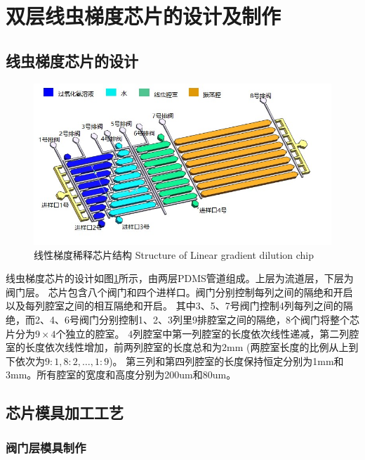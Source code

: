 \section{双层线虫梯度芯片的设计及制作}
\subsection{线虫梯度芯片的设计}
\label{arch-design}
\begin{figure}[htbp]
	  \centering
	  \includegraphics[width=13cm]{figure/chap2/chip-arch.jpg}
	  \bicaption
		{线性梯度稀释芯片结构}
		{Structure of Linear gradient dilution chip}
	  \label{fig:chap2:chip-arch}
	\end{figure}
线虫梯度芯片的设计如图\ref{fig:chap2:chip-arch}所示，由两层PDMS管道组成。上层为流道层，下层为阀门层。
芯片包含八个阀门和四个进样口。阀门分别控制每列之间的隔绝和开启以及每列腔室之间的相互隔绝和开启。
其中3、5、7号阀门控制4列每列之间的隔绝，而2、4、6号阀门分别控制1、2、3列里9排腔室之间的隔绝，8个阀门将整个芯片分为$9\times4$个独立的腔室。
4列腔室中第一列腔室的长度依次线性递减，第二列腔室的长度依次线性增加，前两列腔室的长度总和为2mm (两腔室长度的比例从上到下依次为$9:1,8:2,\dots,1:9$)。
第三列和第四列腔室的长度保持恒定分别为1mm和3mm。所有腔室的宽度和高度分别为200um和80um。

\subsection{芯片模具加工工艺}
\subsubsection{阀门层模具制作}
	
